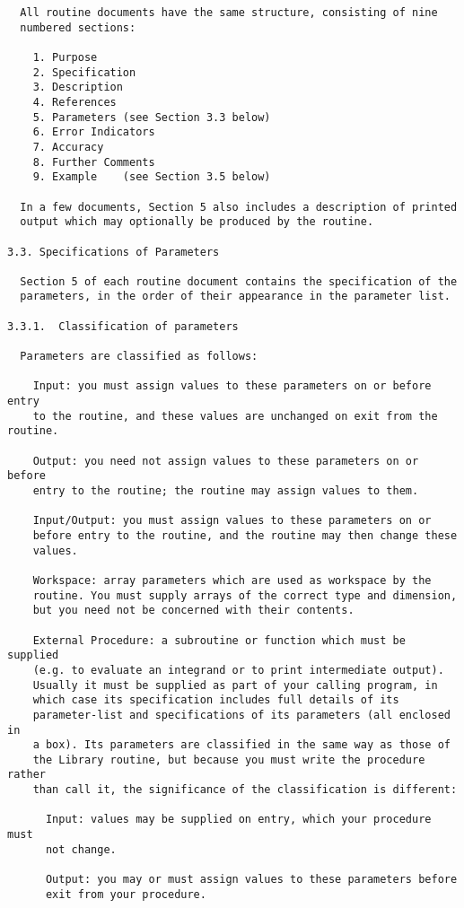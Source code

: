 \begin{verbatim}
  All routine documents have the same structure, consisting of nine
  numbered sections:
 
    1. Purpose
    2. Specification
    3. Description
    4. References
    5. Parameters (see Section 3.3 below)
    6. Error Indicators
    7. Accuracy
    8. Further Comments
    9. Example    (see Section 3.5 below)
 
  In a few documents, Section 5 also includes a description of printed
  output which may optionally be produced by the routine.
 
3.3. Specifications of Parameters
 
  Section 5 of each routine document contains the specification of the
  parameters, in the order of their appearance in the parameter list.
 
3.3.1.  Classification of parameters
 
  Parameters are classified as follows:
 
    Input: you must assign values to these parameters on or before entry
    to the routine, and these values are unchanged on exit from the routine.
 
    Output: you need not assign values to these parameters on or before
    entry to the routine; the routine may assign values to them.
 
    Input/Output: you must assign values to these parameters on or
    before entry to the routine, and the routine may then change these
    values.
 
    Workspace: array parameters which are used as workspace by the
    routine. You must supply arrays of the correct type and dimension,
    but you need not be concerned with their contents.
 
    External Procedure: a subroutine or function which must be supplied
    (e.g. to evaluate an integrand or to print intermediate output).
    Usually it must be supplied as part of your calling program, in
    which case its specification includes full details of its
    parameter-list and specifications of its parameters (all enclosed in
    a box). Its parameters are classified in the same way as those of
    the Library routine, but because you must write the procedure rather
    than call it, the significance of the classification is different:
 
      Input: values may be supplied on entry, which your procedure must
      not change.
 
      Output: you may or must assign values to these parameters before
      exit from your procedure.
 

\end{verbatim}
